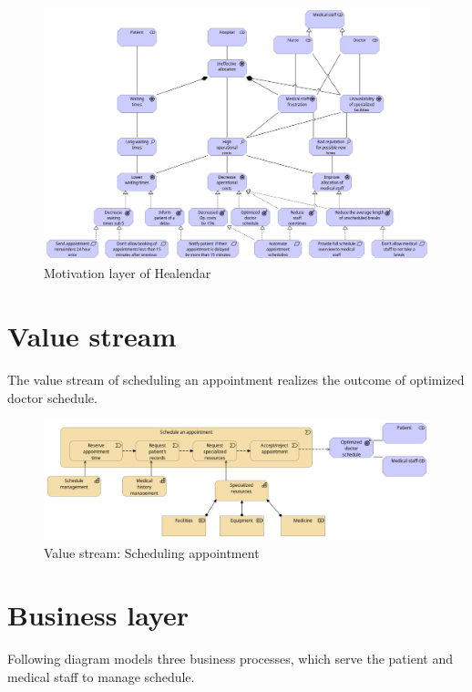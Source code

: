 \documentclass[11pt,english,a4paper,twoside]{article}
\begin{document}
\pagebreak
\begin{figure}[ht]
    \centering
    \includegraphics[width=\textwidth]{./fig/Motivation.png}
    \caption{Motivation layer of Healendar}
    \label{fig:motivation}
\end{figure}

\pagebreak
\section{Value stream}

The value stream of scheduling an appointment realizes the outcome of optimized
doctor schedule.

\begin{figure}[ht]
    \centering
    \includegraphics[width=\textwidth]{./fig/Value stream.png}
    \caption{Value stream: Scheduling appointment}
    \label{fig:value_stream}
\end{figure}

\pagebreak
\section{Business layer}

Following diagram models three business processes, which serve the patient
and medical staff to manage schedule.
\end{document}
